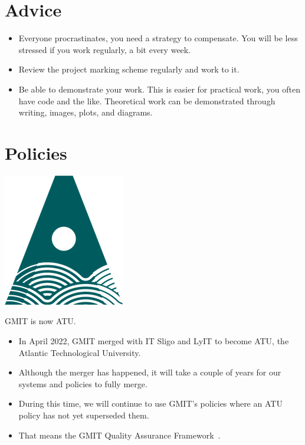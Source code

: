 \documentclass{iansnotes}
\begin{document}
\section{Advice}

\begin{itemize}
  \item Everyone procrastinates, you need a strategy to compensate. You will be less stressed if you work regularly, a bit every week.
  \item Review the project marking scheme regularly and work to it.
  \item Be able to demonstrate your work. This is easier for practical work, you often have code and the like. Theoretical work can be demonstrated through writing, images, plots, and diagrams.
\end{itemize}


\section{Policies}

\begin{marginfigure}%
  \centering
  \includegraphics[width=0.6\linewidth]{img/atu-green.png}
  \caption*{GMIT is now ATU.}
  \label{fig:atulogo}
\end{marginfigure}

\begin{itemize}
  \item In April 2022, GMIT merged with IT Sligo and LyIT to become ATU, the Atlantic Technological University.
  \item Although the merger has happened, it will take a couple of years for our systems and policies to fully merge.
  \item During this time, we will continue to use GMIT's policies where an ATU policy has not yet superseded them.
  \item That means the GMIT Quality Assurance Framework~\autocite{gmitqaf}.
\end{itemize} 
\end{document}
